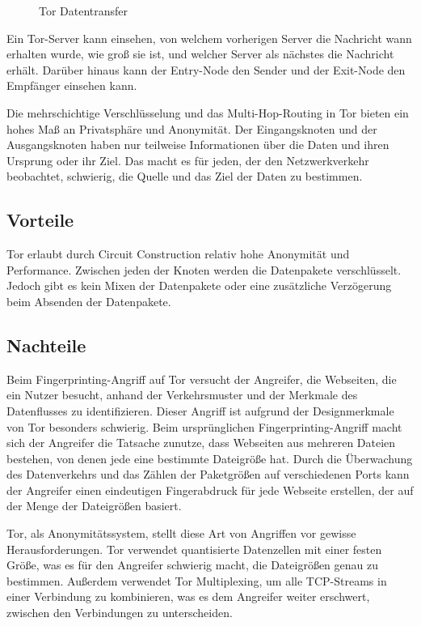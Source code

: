 \begin{figure}[h!]
    \centering
    
    \caption{Tor Datentransfer}
    \label{imgs:tor_transfer}
\end{figure}

Ein Tor-Server kann einsehen, von welchem vorherigen Server die Nachricht wann erhalten wurde, wie groß sie ist, und welcher Server als nächstes die Nachricht erhält. Darüber hinaus kann der Entry-Node den Sender und der Exit-Node den Empfänger einsehen kann.

Die mehrschichtige Verschlüsselung und das Multi-Hop-Routing in Tor bieten ein hohes Maß an Privatsphäre und Anonymität. Der Eingangsknoten und der Ausgangsknoten haben nur teilweise Informationen über die Daten und ihren Ursprung oder ihr Ziel. Das macht es für jeden, der den Netzwerkverkehr beobachtet, schwierig, die Quelle und das Ziel der Daten zu bestimmen\footnotemark{}.

\subsection{Vorteile}

Tor erlaubt durch Circuit Construction relativ hohe Anonymität und Performance. Zwischen jeden der Knoten werden die Datenpakete verschlüsselt. Jedoch gibt es kein Mixen der Datenpakete oder eine zusätzliche Verzögerung beim Absenden der Datenpakete.

\subsection{Nachteile}

Beim Fingerprinting-Angriff auf Tor versucht der Angreifer, die Webseiten, die ein Nutzer besucht, anhand der Verkehrsmuster und der Merkmale des Datenflusses zu identifizieren. Dieser Angriff ist aufgrund der Designmerkmale von Tor besonders schwierig. Beim ursprünglichen Fingerprinting-Angriff macht sich der Angreifer die Tatsache zunutze, dass Webseiten aus mehreren Dateien bestehen, von denen jede eine bestimmte Dateigröße hat. Durch die Überwachung des Datenverkehrs und das Zählen der Paketgrößen auf verschiedenen Ports kann der Angreifer einen eindeutigen Fingerabdruck für jede Webseite erstellen, der auf der Menge der Dateigrößen basiert.

Tor, als Anonymitätssystem, stellt diese Art von Angriffen vor gewisse Herausforderungen. Tor verwendet quantisierte Datenzellen mit einer festen Größe, was es für den Angreifer schwierig macht, die Dateigrößen genau zu bestimmen. Außerdem verwendet Tor Multiplexing, um alle TCP-Streams in einer Verbindung zu kombinieren, was es dem Angreifer weiter erschwert, zwischen den Verbindungen zu unterscheiden.

